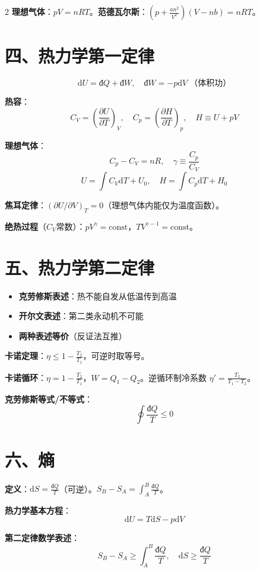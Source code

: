 \documentclass[10pt,a4paper,fontset=mac]{ctexart}
\newcommand{\dd}{\mathrm{d}}
\newcommand{\đ}{\mathrm{đ}}
\begin{document}
\begin{multicols}{2}
\textbf{理想气体}：$pV=nRT$。\textbf{范德瓦尔斯}：$(p+\frac{an^2}{V^2})(V-nb)=nRT$。

\section*{四、热力学第一定律}

\[
\dd U=\đ Q+\đ W,\quad \đ W=-p\dd V\;\text{（体积功）}
\]

\textbf{热容}：
\[
C_V=\left(\frac{\partial U}{\partial T}\right)_V,\quad
C_p=\left(\frac{\partial H}{\partial T}\right)_p,\quad
H\equiv U+pV
\]

\textbf{理想气体}：
\[
\boxed{C_p-C_V=nR},\quad \gamma\equiv\frac{C_p}{C_V}
\]
\[
U=\int C_V\dd T+U_0,\quad H=\int C_p\dd T+H_0
\]

\textbf{焦耳定律}：$(\partial U/\partial V)_T=0$（理想气体内能仅为温度函数）。

\textbf{绝热过程}（$C_V$常数）：$pV^\gamma=\text{const}$，$TV^{\gamma-1}=\text{const}$。

\section*{五、热力学第二定律}

\begin{itemize}
\item \textbf{克劳修斯表述}：热不能自发从低温传到高温
\item \textbf{开尔文表述}：第二类永动机不可能
\item \textbf{两种表述等价}（反证法互推）
\end{itemize}

\textbf{卡诺定理}：$\eta\le1-\frac{T_2}{T_1}$，可逆时取等号。

\textbf{卡诺循环}：$\eta=1-\frac{T_2}{T_1}$，$W=Q_1-Q_2$。逆循环制冷系数 $\eta'=\frac{T_2}{T_1-T_2}$。

\textbf{克劳修斯等式/不等式}：
\[
\boxed{\oint\frac{\đ Q}{T}\le0}
\]

\section*{六、熵}

\textbf{定义}：$\dd S=\frac{\đ Q}{T}$（可逆）。$S_B-S_A=\int_A^B\frac{\đ Q}{T}$。

\textbf{热力学基本方程}：
\[
\boxed{\dd U=T\dd S-p\dd V}
\]

\textbf{第二定律数学表述}：
\[
\boxed{S_B-S_A\ge\int_A^B\frac{\đ Q}{T}},\quad \dd S\ge\frac{\đ Q}{T}
\]


\end{multicols}
\end{document}
